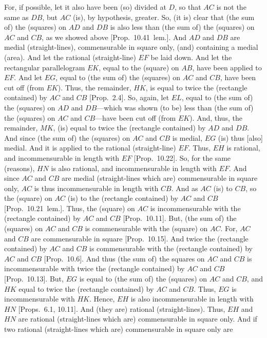 \begin{Parallel}{}{}
{For, if possible, let it also have  been (so) divided at $D$, so that $AC$ is not the
same as $DB$, but $AC$ (is), by hypothesis, greater. So, (it is)  clear that
(the sum of) the (squares) on $AD$ and $DB$ is also less than (the sum of)
the (squares) on $AC$ and $CB$, as we showed above [Prop.~10.41~lem.].  And $AD$ and $DB$ are medial (straight-lines), commensurable in square only, (and)
containing a medial (area). And let the rational (straight-line) $EF$
be laid down. And let the rectangular parallelogram $EK$, equal to the (square) on $AB$, have been applied to $EF$. And let $EG$, equal to
(the sum of) the (squares) on $AC$ and $CB$, have been cut  off (from $EK$).
Thus, the remainder, $HK$, is equal to twice the (rectangle contained)
by $AC$ and $CB$ [Prop.~2.4]. So, again,
let $EL$, equal to  (the sum of) the (squares) on  $AD$ and $DB$---which was shown (to be) less than (the sum of) the (squares) on $AC$ and
$CB$---have been cut off (from $EK$). And, thus, the remainder, $MK$,
(is) equal to twice the (rectangle contained) by $AD$ and $DB$. 
And since (the sum of) the (squares) on $AC$ and $CB$ is medial, $EG$ (is) thus [also]
medial. And it is applied to the rational (straight-line) $EF$. Thus, $EH$
is rational, and incommensurable in length with $EF$ [Prop.~10.22]. So, for the same (reasons), $HN$
is also rational, and incommensurable in length with $EF$. And since 
$AC$ and $CB$  are medial (straight-lines which are) commensurable
in square only, $AC$ is thus incommensurable in length with $CB$.
And as $AC$ (is) to $CB$, so the (square) on $AC$ (is) to the
(rectangle contained) by $AC$ and $CB$ [Prop.~10.21~lem.]. Thus, the (square) on $AC$ is
incommensurable with the (rectangle contained) by $AC$ and $CB$
[Prop.~10.11]. But, (the sum of) the (squares)
on $AC$ and $CB$ is commensurable with the (square) on $AC$.
For, $AC$ and $CB$ are commensurable in square [Prop.~10.15]. And
twice the (rectangle contained) by $AC$ and $CB$ is commensurable with the (rectangle contained) by $AC$ and $CB$ [Prop.~10.6]. And thus
(the sum of) the squares on $AC$ and $CB$ is incommensurable with twice
the (rectangle contained) by $AC$ and $CB$ [Prop.~10.13]. But, $EG$ is equal to (the sum
of) the (squares) on $AC$ and $CB$, and $HK$ equal to twice the (rectangle
contained) by $AC$ and $CB$. Thus, $EG$ is incommensurable
with $HK$. Hence, $EH$ is also incommensurable in length with  $HN$
[Props.~6.1, 10.11].
And (they are)  rational (straight-lines). Thus, $EH$ and $HN$ are rational
(straight-lines which are) commensurable in square only. And if two
rational (straight-lines which are) commensurable in square only are
}
\end{Parallel}
